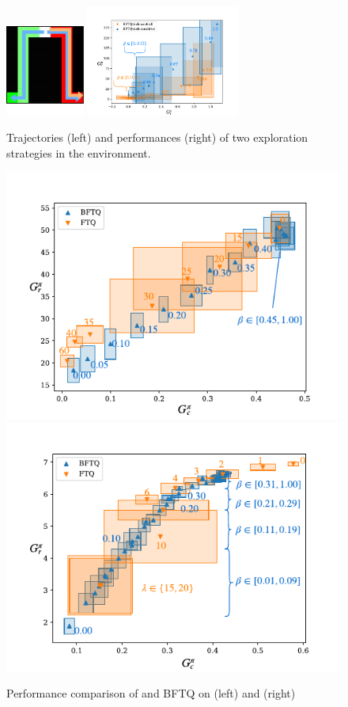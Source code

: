\documentclass{article}
\begin{document}
\begin{figure}[tp]
    \centering
    \includegraphics[width=0.23\textwidth]{source/img/test.pdf}
    \includegraphics[page=1, width=0.45\textwidth]{source/img/corridors}
    \caption{Trajectories (left) and performances (right) of two exploration strategies in the  environment. }
    \label{fig:exploration}
\end{figure}


\begin{figure}[tp]
    \begin{center}
    \includegraphics[width=0.49\linewidth]{source/img/slot-filling}
    \includegraphics[width=0.49\linewidth]{source/img/highway}
    \caption{Performance comparison of \FTQl and BFTQ on  (left) and (right) }
    \label{fig:results}
    \end{center}
\end{figure}
\end{document}
